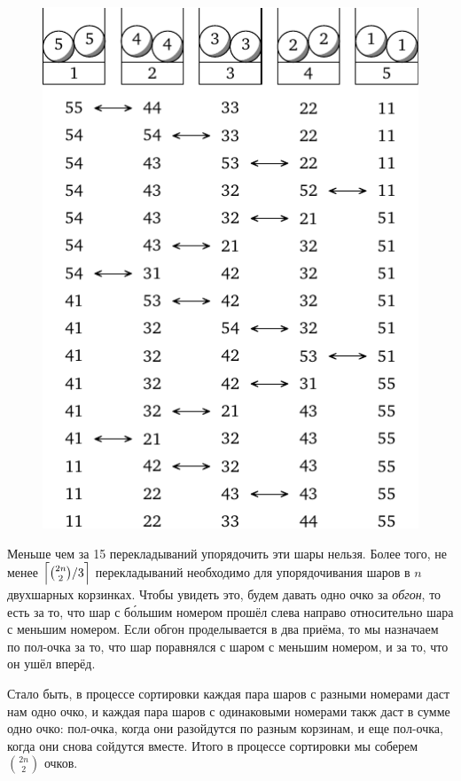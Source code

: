 \documentclass[twoside]{book}
\begin{document}
\begin{figure}[!ht]
\vspace{\jot}
\centering
\includegraphics{mp/wink-280}
\vspace{-3\jot}
\end{figure}

Меньше чем за 15 перекладываний упорядочить эти шары нельзя.
Более
того, не менее $\Bigl\lceil\binom{2n}{2}/3\Bigr\rceil$ перекладываний
необходимо для упорядочивания шаров в $n$ двухшарных корзинках.
Чтобы
увидеть это, будем давать одно очко за \emph{обгон}, то есть за то, что
шар с б\'{о}льшим номером прошёл слева направо относительно шара с
меньшим номером.
Если обгон проделывается в два приёма, то мы
назначаем по пол-очка за то, что шар поравнялся с шаром с меньшим
номером, и за то, что он ушёл вперёд.

Стало быть, в процессе сортировки каждая пара шаров с разными номерами
даст нам одно очко, и каждая пара шаров с одинаковыми номерами такж
даст в сумме одно очко: пол-очка, когда они разойдутся по разным
корзинам, и еще пол-очка, когда они снова сойдутся вместе. Итого
в процессе сортировки мы соберем $\binom{2n}2$
очков.
\end{document}
